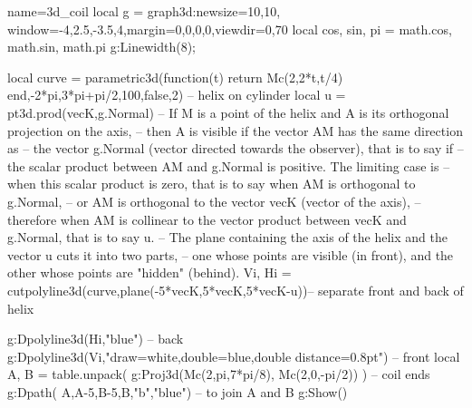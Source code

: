 \documentclass[10pt]{standalone}%
\begin{document}
\begin{luadraw}{name=3d_coil}
local g = graph3d:new{size={10,10}, window={-4,2.5,-3.5,4},margin={0,0,0,0},viewdir={0,70}}
local cos, sin, pi = math.cos, math.sin, math.pi
g:Linewidth(8);

local curve = parametric3d(function(t) return Mc(2,2*t,t/4) end,-2*pi,3*pi+pi/2,100,false,2) -- helix on cylinder
local u = pt3d.prod(vecK,g.Normal)
-- If M is a point of the helix and A is its orthogonal projection on the axis,
-- then A is visible if the vector AM has the same direction as 
-- the vector g.Normal (vector directed towards the observer), that is to say if 
-- the scalar product between AM and g.Normal is positive. The limiting case is 
-- when this scalar product is zero, that is to say when AM is orthogonal to g.Normal, 
-- or AM is orthogonal to the vector vecK (vector of the axis), 
-- therefore when AM is collinear to the vector product between vecK and g.Normal, that is to say u.
-- The plane containing the axis of the helix and the vector u cuts it into two parts, 
-- one whose points are visible (in front), and the other whose points are "hidden" (behind).
Vi, Hi = cutpolyline3d(curve,plane(-5*vecK,5*vecK,5*vecK-u))-- separate front and back of helix

g:Dpolyline3d(Hi,"blue") -- back
g:Dpolyline3d(Vi,"draw=white,double=blue,double distance=0.8pt") -- front
local A, B = table.unpack( g:Proj3d({Mc(2,pi,7*pi/8), Mc(2,0,-pi/2)}) ) -- coil ends
g:Dpath( {A,A-5,B-5,B,"b"},"blue") -- to join A and B
g:Show() 
\end{luadraw}
\end{document}
